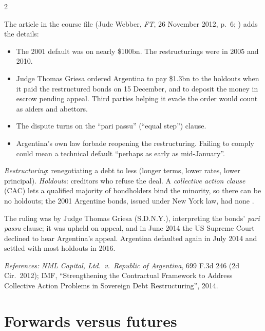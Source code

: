 \begin{paracol}{2}
\begin{casestudy}
The article in the course file (Jude Webber, \emph{FT}, 26 November 2012, p.~6; ) adds the details:
\begin{itemize}
  \item The 2001 default was on nearly \$100bn. The restructurings were in 2005 and 2010.
  \item Judge Thomas Griesa ordered Argentina to pay \$1.3bn to the holdouts when it paid the restructured bonds on 15 December, and to deposit the money in escrow pending appeal. Third parties helping it evade the order would count as aiders and abettors.
  \item The dispute turns on the ``pari passu'' (``equal step'') clause.
  \item Argentina's own law forbade reopening the restructuring. Failing to comply could mean a technical default ``perhaps as early as mid-January''.
\end{itemize}
\end{casestudy}

\begin{definition}
\emph{Restructuring}: renegotiating a debt to less (longer terms, lower rates, lower principal). \emph{Holdouts}: creditors who refuse the deal. A \emph{collective
action clause} (CAC) lets a qualified majority of bondholders bind the minority, so there can be no holdouts; the 2001 Argentine bonds, issued under New York law,
had none .
\end{definition}

\begin{history}
The ruling was by Judge Thomas Griesa (S.D.N.Y.), interpreting the bonds' \emph{pari passu} clause; it was upheld on appeal, and in June 2014 the US Supreme Court
declined to hear Argentina's appeal. Argentina defaulted again in July 2014 and settled with most holdouts in 2016.\par
\emph{References:} \emph{NML Capital, Ltd.\ v.\ Republic of Argentina}, 699 F.3d 246 (2d Cir.\ 2012); IMF, ``Strengthening the Contractual Framework to Address
Collective Action Problems in Sovereign Debt Restructuring'', 2014.
\end{history}

\section{Forwards versus futures}\label{sec:ff-fwdfut}


\end{paracol}
